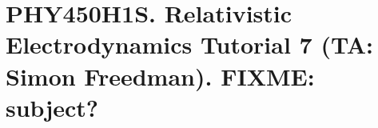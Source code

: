 
%

\chapter{PHY450H1S.  Relativistic Electrodynamics Tutorial 7 (TA: Simon Freedman).  FIXME: subject?}
\label{chap:relativisticElectrodynamicsT7}
{}
\date{Mar 17, 2011}

\beginArtWithToc

\section{}

\EndNoBibArticle

